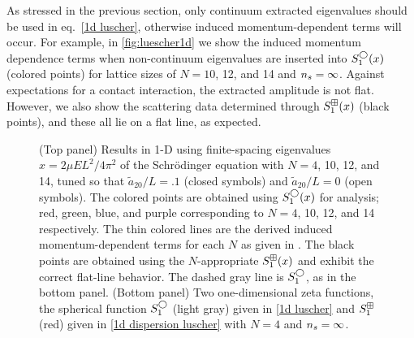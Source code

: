 As stressed in the previous section, only continuum extracted eigenvalues should be used in eq.~\eqref{1d luscher}, otherwise induced momentum-dependent terms will occur.
For example, in \autoref{fig:luescher1d} we show the induced momentum dependence terms when non-continuum eigenvalues are inserted into $S^{\bigcirc}_1(x)$ (colored points) for lattice sizes of $N=10$, 12, and 14 and ${n_s}=\infty$.
Against expectations for a contact interaction, the extracted amplitude is not flat.
However, we also show the scattering data determined through $S^{\boxplus}_1(x)$ (black points), and these all lie on a flat line, as expected.

\begin{figure}
\center
    \center
    
    \caption{
        (Top panel)
        Results in 1-D using finite-spacing eigenvalues $x=2\mu EL^2/4\pi^2$ of the Schr\"odinger equation with $N=4$, 10, 12, and 14, tuned so that $\tilde a_{20}/L=.1$ (closed symbols) and $\tilde a_{20}/L=0$ (open symbols).
        The colored points are obtained using $S^\bigcirc_1(x)$ for analysis; red, green, blue, and purple corresponding to $N=4$, 10, 12, and 14 respectively.
        The thin colored lines are the derived induced momentum-dependent terms for each $N$ as given in .
        The black points are obtained using the $N$-appropriate $S^{\boxplus}_1(x)$ and exhibit the correct flat-line behavior.
        The dashed gray line is $S_1^\bigcirc$, as in the bottom panel.
        (Bottom panel)
        Two one-dimensional zeta functions, the spherical function $S_1^{\bigcirc}$ (light gray) given in \eqref{1d luscher} and $S_1^{\boxplus}$ (red) given in \eqref{1d dispersion luscher} with $N=4$ and ${n_s}=\infty$.
        }
        \label{fig:luescher1d}
\end{figure}

